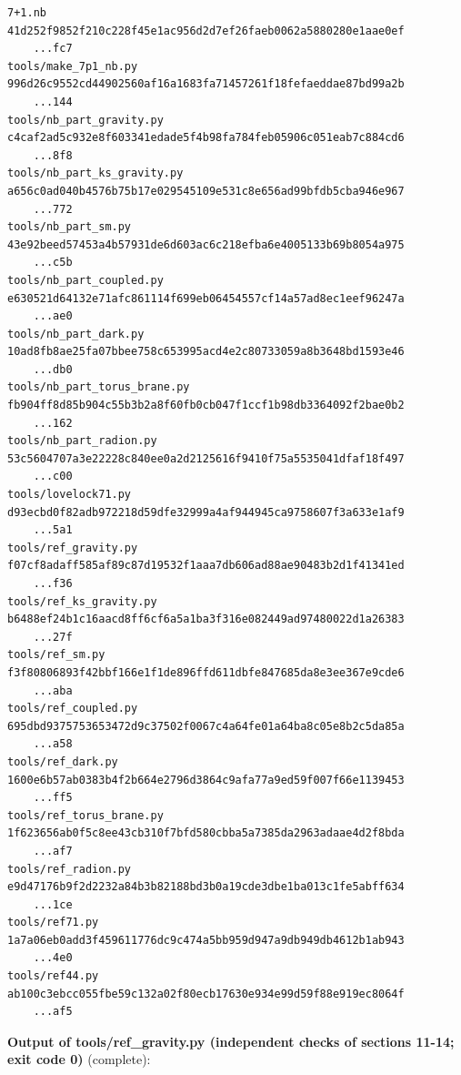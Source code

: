 \documentclass[10pt,a4paper]{article}
\begin{document}
\begin{Verbatim}[fontsize=\small,frame=single,framesep=2mm]
7+1.nb                             41d252f9852f210c228f45e1ac956d2d7ef26faeb0062a5880280e1aae0ef
    ...fc7
tools/make_7p1_nb.py               996d26c9552cd44902560af16a1683fa71457261f18fefaeddae87bd99a2b
    ...144
tools/nb_part_gravity.py           c4caf2ad5c932e8f603341edade5f4b98fa784feb05906c051eab7c884cd6
    ...8f8
tools/nb_part_ks_gravity.py        a656c0ad040b4576b75b17e029545109e531c8e656ad99bfdb5cba946e967
    ...772
tools/nb_part_sm.py                43e92beed57453a4b57931de6d603ac6c218efba6e4005133b69b8054a975
    ...c5b
tools/nb_part_coupled.py           e630521d64132e71afc861114f699eb06454557cf14a57ad8ec1eef96247a
    ...ae0
tools/nb_part_dark.py              10ad8fb8ae25fa07bbee758c653995acd4e2c80733059a8b3648bd1593e46
    ...db0
tools/nb_part_torus_brane.py       fb904ff8d85b904c55b3b2a8f60fb0cb047f1ccf1b98db3364092f2bae0b2
    ...162
tools/nb_part_radion.py            53c5604707a3e22228c840ee0a2d2125616f9410f75a5535041dfaf18f497
    ...c00
tools/lovelock71.py                d93ecbd0f82adb972218d59dfe32999a4af944945ca9758607f3a633e1af9
    ...5a1
tools/ref_gravity.py               f07cf8adaff585af89c87d19532f1aaa7db606ad88ae90483b2d1f41341ed
    ...f36
tools/ref_ks_gravity.py            b6488ef24b1c16aacd8ff6cf6a5a1ba3f316e082449ad97480022d1a26383
    ...27f
tools/ref_sm.py                    f3f80806893f42bbf166e1f1de896ffd611dbfe847685da8e3ee367e9cde6
    ...aba
tools/ref_coupled.py               695dbd9375753653472d9c37502f0067c4a64fe01a64ba8c05e8b2c5da85a
    ...a58
tools/ref_dark.py                  1600e6b57ab0383b4f2b664e2796d3864c9afa77a9ed59f007f66e1139453
    ...ff5
tools/ref_torus_brane.py           1f623656ab0f5c8ee43cb310f7bfd580cbba5a7385da2963adaae4d2f8bda
    ...af7
tools/ref_radion.py                e9d47176b9f2d2232a84b3b82188bd3b0a19cde3dbe1ba013c1fe5abff634
    ...1ce
tools/ref71.py                     1a7a06eb0add3f459611776dc9c474a5bb959d947a9db949db4612b1ab943
    ...4e0
tools/ref44.py                     ab100c3ebcc055fbe59c132a02f80ecb17630e934e99d59f88e919ec8064f
    ...af5
\end{Verbatim}
\textbf{Output of tools/ref\_gravity.py (independent checks of sections 11-14; exit code 0)} (complete):
\end{document}
